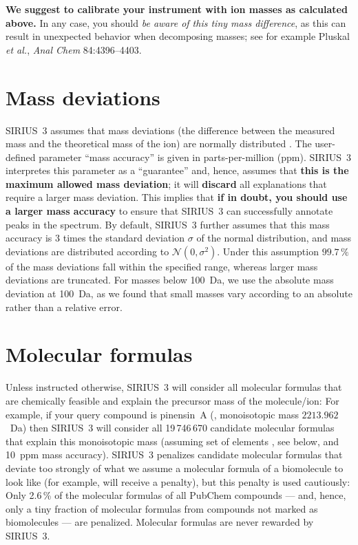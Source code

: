 \documentclass[letterpaper,10pt,openany,oneside]{sphinxmanual}
\begin{document}
\textbf{We suggest to calibrate your instrument with ion masses as calculated
above.}  In any case, you should \emph{be aware of this tiny mass
difference}, as this can result in unexpected behavior when decomposing
masses; see for example Pluskal \emph{et al.}, \emph{Anal Chem} 84:4396--4403.


\section{Mass deviations}
\label{sec:mass-deviations}

SIRIUS~3 assumes that mass deviations (the difference between the measured
mass and the theoretical mass of the ion) are normally distributed
\citep{jaitly06robust, zubarev07proper, boecker16fragmentation}.  The
user-defined parameter ``mass accuracy'' is given in parts-per-million (ppm).
SIRIUS~3 interpretes this parameter as a ``guarantee'' and, hence, assumes
that \textbf{this is the maximum allowed mass deviation}; it
will \textbf{discard} all explanations that require a larger mass deviation.
This implies that \textbf{if in doubt, you should use a larger mass accuracy}
to ensure that SIRIUS~3 can successfully annotate peaks in the spectrum.  By
default, SIRIUS~3 further assumes that this mass accuracy is 3 times the
standard deviation $\sigma$ of the normal distribution, and mass deviations
are distributed according to $\mathcal{N}(0,\sigma^2)$.  Under this
assumption $99.7\,\%$ of the mass deviations fall within the specified range,
whereas larger mass deviations are truncated.  For masses below 100~Da, we
use the absolute mass deviation at 100~Da, as we found that small masses vary
according to an absolute rather than a relative error.


\section{Molecular formulas}

Unless instructed otherwise, SIRIUS~3 will consider all molecular formulas
that are chemically feasible and explain the precursor mass of the
molecule/ion: For example, if your query compound is pinensin~A
(, monoisotopic mass $2213.962$~Da) then SIRIUS~3 will
consider all 19\,746\,670 candidate molecular formulas that explain this
monoisotopic mass (assuming set of elements , see below, and
10~ppm mass accuracy).  SIRIUS~3 penalizes candidate molecular formulas that
deviate too strongly of what we assume a molecular formula of a biomolecule
to look like (for example,  will receive a penalty), but this
penalty is used cautiously: Only 2.6\,\% of the molecular formulas of all
PubChem compounds --- and, hence, only a tiny fraction of molecular formulas
from compounds not marked as biomolecules --- are penalized.  Molecular
formulas are never rewarded by SIRIUS~3.
\end{document}

